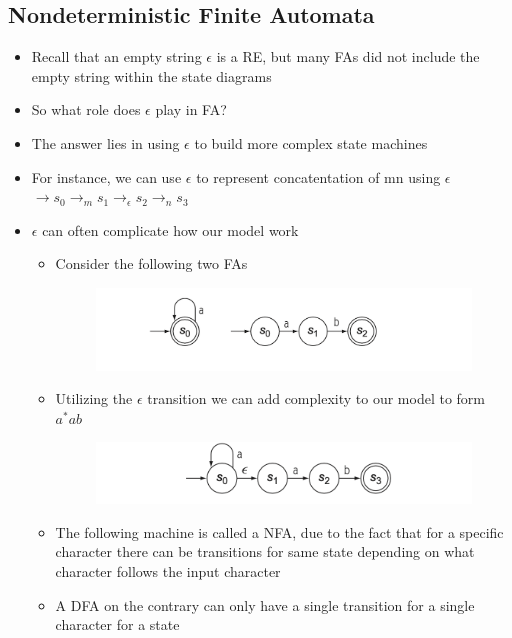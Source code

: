 \documentclass[20pt]{article}
\begin{document}
                    \subsection*{Nondeterministic Finite Automata}
                
                        \begin{itemize}
                            \item Recall that an empty string $\epsilon$ is a RE, but many FAs did not include the empty string within the state diagrams
                            \item So what role does $\epsilon$ play in  FA? 
                            \item The answer lies in using $\epsilon$ to build more complex state machines
                            \item For instance, we can use $\epsilon$ to represent concatentation of mn using $\epsilon$
				                    \subitem $\rightarrow s_0 \rightarrow_m s_1 \rightarrow_{\epsilon} s_2 \rightarrow_{n} s_3$
			                \item $\epsilon$ can often complicate how our model work
                                  \begin{itemize}
                                    \item Consider the following two FAs
                                    \begin{figure}[h]
                                    \includegraphics[width=\textwidth]{Images/uncombined.png}
                                    \end{figure}
                                    \newpage
                                    \item Utilizing the $\epsilon$ transition we can add complexity to our model to form $a^*ab$
                                    \begin{figure}[h]
                                        \includegraphics[width=\textwidth]{Images/combined.png}
                                        \end{figure} 
                                    \item The following machine is called a NFA, due to the fact that for a specific character there can be transitions for same state depending on what character follows the input character 
                                    \item A DFA on the contrary can only have a single transition for a single character for a state
                            

\end{itemize}
\end{itemize}
\end{document}
